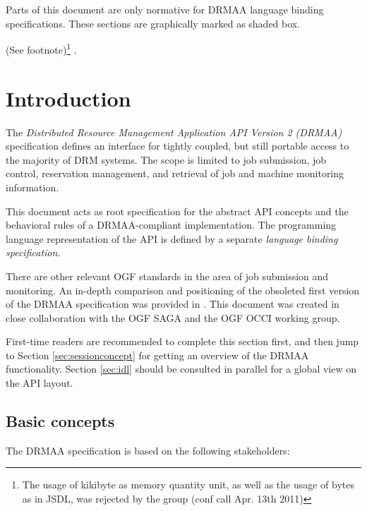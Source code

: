 \documentclass{article}
\newcommand{\langbind}[1]{\begin{shaded}#1\end{shaded}}
\newcommand{\rat}[1]{ {\tiny(See footnote)}\footnote{#1} }
\begin{document}
\langbind{
Parts of this document are only normative for DRMAA language binding specifications. These sections are graphically marked as shaded box.
}

\rat{The usage of kikibyte as memory quantity unit, as well as the usage of bytes as in JSDL, was rejected by the group (conf call Apr. 13th 2011)}. 

\newpage
\tableofcontents
\newpage

\section{Introduction}
\label{sec:introduction}

 The \emph{Distributed Resource Management Application API Version 2 (DRMAA)} specification defines an interface for tightly coupled, but still portable access to the majority of DRM systems. The scope is limited to job submission, job control, reservation management, and retrieval of job and machine monitoring information. 

This document acts as root specification for the abstract API concepts and the behavioral rules of a DRMAA-compliant implementation. The programming language representation of the API is defined by a separate \emph{language binding specification}.  

There are other relevant OGF standards in the area of job submission and monitoring. An in-depth comparison and positioning of the obsoleted first version of the DRMAA \cite{gfd.133} specification was provided in \cite{drmaa09}. This document was created in close collaboration with the OGF SAGA and the OGF OCCI working group.

First-time readers are recommended to complete this section first, and then jump to Section \ref{sec:sessionconcept} for getting an overview of the DRMAA functionality. Section \ref{sec:idl} should be consulted in parallel for a global view on the API layout.

\subsection{Basic concepts}
\label{sec:concepts}

The DRMAA specification is based on the following stakeholders:
\end{document}
